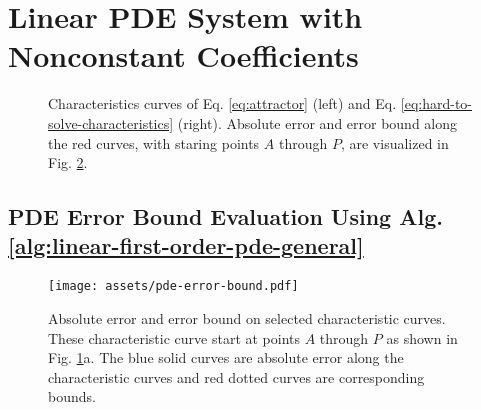 \section{Linear PDE System with Nonconstant Coefficients } \label{section:experiment-attractor}
    \makeatletter
    \setlength{\@fptop}{0pt}
    \begin{figure}[!ht]
        \centering
        \caption{
            Characteristics curves of Eq. \eqref{eq:attractor} (left) and Eq. \eqref{eq:hard-to-solve-characteristics} (right). 
            Absolute error and error bound along the red curves, with staring points $A$ through $P$, are visualized in Fig. \ref{fig:pde-error-bound}.
        }\label{fig:characteristics}
    \end{figure}
    \makeatother

\subsection{PDE Error Bound Evaluation Using Alg. \ref{alg:linear-first-order-pde-general}}
    \makeatletter
    \setlength{\@fptop}{0pt}
    \begin{figure}[!ht]
        \centering
        \texttt{[image: assets/pde-error-bound.pdf]}
        \caption{
            Absolute error and error bound on selected characteristic curves. 
            These characteristic curve start at points $A$ through $P$ as shown in Fig. \ref{fig:characteristics}a.
            The blue solid curves are absolute error along the characteristic curves and red dotted curves are corresponding bounds.
        }\label{fig:pde-error-bound}
    \end{figure}
    \makeatother

